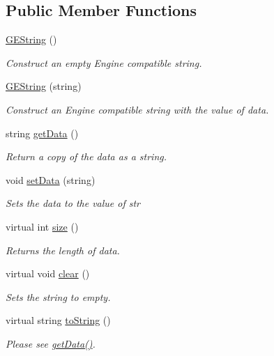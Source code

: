 \subsection*{Public Member Functions}
\begin{DoxyCompactItemize}
\item 
\hypertarget{class_g_e_string_adebf6dcc0fae4898e6dd3410447113d6}{\hyperlink{class_g_e_string_adebf6dcc0fae4898e6dd3410447113d6}{G\-E\-String} ()}\label{class_g_e_string_adebf6dcc0fae4898e6dd3410447113d6}

\begin{DoxyCompactList}\small\item\em Construct an empty Engine compatible string. \end{DoxyCompactList}\item 
\hyperlink{class_g_e_string_a7a629e649a5ec09603e839c0e0dd5e1e}{G\-E\-String} (string)
\begin{DoxyCompactList}\small\item\em Construct an Engine compatible string with the value of {\itshape data}. \end{DoxyCompactList}\item 
string \hyperlink{class_g_e_string_a7b91a6c62c744e3d05a2410b0eb90e47}{get\-Data} ()
\begin{DoxyCompactList}\small\item\em Return a copy of the data as a string. \end{DoxyCompactList}\item 
void \hyperlink{class_g_e_string_a1324fa0046f6ca0d85dc9f3298f036f1}{set\-Data} (string)
\begin{DoxyCompactList}\small\item\em Sets the data to the value of {\itshape str} \end{DoxyCompactList}\item 
virtual int \hyperlink{class_g_e_string_a7bb7b3fdc5f217ad32f6795250bdb376}{size} ()
\begin{DoxyCompactList}\small\item\em Returns the length of data. \end{DoxyCompactList}\item 
virtual void \hyperlink{class_g_e_string_a18bdaa90b17b538174ce61bb6dcc87c7}{clear} ()
\begin{DoxyCompactList}\small\item\em Sets the string to empty. \end{DoxyCompactList}\item 
\hypertarget{class_g_e_string_a058bcd0c32105659eab4194e2c9efe92}{virtual string \hyperlink{class_g_e_string_a058bcd0c32105659eab4194e2c9efe92}{to\-String} ()}\label{class_g_e_string_a058bcd0c32105659eab4194e2c9efe92}

\begin{DoxyCompactList}\small\item\em Please see \hyperlink{class_g_e_string_a7b91a6c62c744e3d05a2410b0eb90e47}{get\-Data()}. \end{DoxyCompactList}\end{DoxyCompactItemize}
